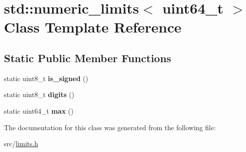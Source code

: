 \hypertarget{classstd_1_1numeric__limits_3_01uint64__t_01_4}{}\section{std\+:\+:numeric\+\_\+limits$<$ uint64\+\_\+t $>$ Class Template Reference}
\label{classstd_1_1numeric__limits_3_01uint64__t_01_4}
\subsection*{Static Public Member Functions}
\begin{DoxyCompactItemize}
\item 
\hypertarget{classstd_1_1numeric__limits_3_01uint64__t_01_4_abd529b27579bb255862d185aae752b66}{}\label{classstd_1_1numeric__limits_3_01uint64__t_01_4_abd529b27579bb255862d185aae752b66} 
static uint8\+\_\+t {\bfseries is\+\_\+signed} ()
\item 
\hypertarget{classstd_1_1numeric__limits_3_01uint64__t_01_4_a88acf52f05b3044df29bf5f518eadc9b}{}\label{classstd_1_1numeric__limits_3_01uint64__t_01_4_a88acf52f05b3044df29bf5f518eadc9b} 
static uint8\+\_\+t {\bfseries digits} ()
\item 
\hypertarget{classstd_1_1numeric__limits_3_01uint64__t_01_4_a2816ac1e866c55b9160dc6d83590f719}{}\label{classstd_1_1numeric__limits_3_01uint64__t_01_4_a2816ac1e866c55b9160dc6d83590f719} 
static uint64\+\_\+t {\bfseries max} ()
\end{DoxyCompactItemize}


The documentation for this class was generated from the following file\+:\begin{DoxyCompactItemize}
\item 
src/\hyperlink{limits_8h}{limits.\+h}\end{DoxyCompactItemize}
